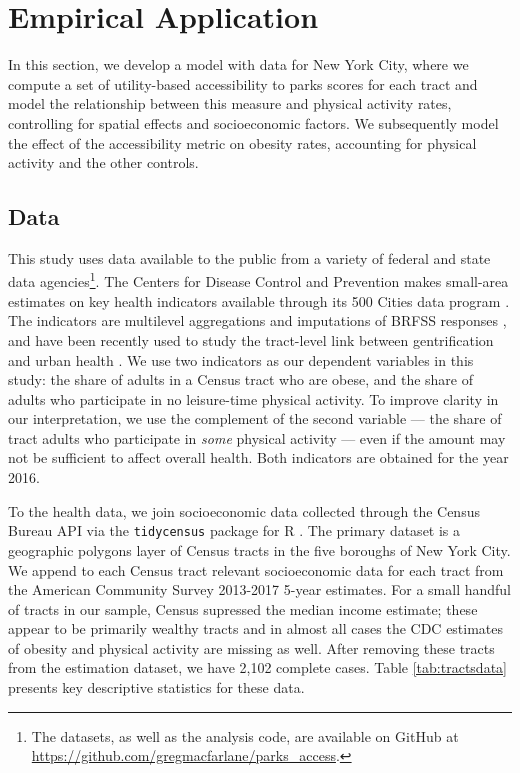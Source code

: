 \documentclass[Afour,sageh.bst]{sagej}
\begin{document}
\hypertarget{empirical-application}{%
\section{Empirical Application}\label{empirical-application}}

In this section, we develop a model with data for New York City, where
we compute a set of utility-based accessibility to parks scores for each
tract and model the relationship between this measure and physical
activity rates, controlling for spatial effects and socioeconomic
factors. We subsequently model the effect of the accessibility metric on
obesity rates, accounting for physical activity and the other controls.

\hypertarget{data}{%
\subsection{Data}\label{data}}

This study uses data available to the public from a variety of federal
and state data agencies\footnote{The datasets, as well as the analysis
  code, are available on GitHub at
  \url{https://github.com/gregmacfarlane/parks_access}.}. The Centers
for Disease Control and Prevention makes small-area estimates on key
health indicators available through its 500 Cities data program
\citep{CDC5002016}. The indicators are multilevel aggregations and
imputations of BRFSS responses \citep{Wang2018, Wang2017}, and have been
recently used to study the tract-level link between gentrification and
urban health \citep{Gibbons2018}. We use two indicators as our dependent
variables in this study: the share of adults in a Census tract who are
obese, and the share of adults who participate in no leisure-time
physical activity. To improve clarity in our interpretation, we use the
complement of the second variable --- the share of tract adults who
participate in \emph{some} physical activity --- even if the amount may
not be sufficient to affect overall health. Both indicators are obtained
for the year 2016.

To the health data, we join socioeconomic data collected through the
Census Bureau API via the \texttt{tidycensus} package for R
\citep{Walker2019}. The primary dataset is a geographic polygons layer
of Census tracts in the five boroughs of New York City. We append to
each Census tract relevant socioeconomic data for each tract from the
American Community Survey 2013-2017 5-year estimates. For a small
handful of tracts in our sample, Census supressed the median income
estimate; these appear to be primarily wealthy tracts and in almost all
cases the CDC estimates of obesity and physical activity are missing as
well. After removing these tracts from the estimation dataset, we have
2,102 complete cases. Table \ref{tab:tractsdata} presents key
descriptive statistics for these data.
\end{document}
